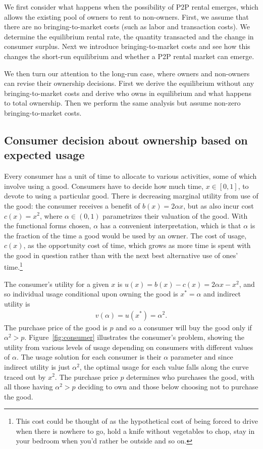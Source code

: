 \documentclass[11pt]{article}
\begin{document}
We first consider what happens when the possibility of P2P rental emerges, which allows the existing pool of owners to rent to non-owners. 
First, we assume that there are no bringing-to-market costs (such as labor and transaction costs).
We determine the equilibrium rental rate, the quantity transacted and the change in consumer surplus. 
Next we introduce bringing-to-market costs and see how this changes the short-run equilibrium and whether a P2P rental market can emerge. 

We then turn our attention to the long-run case, where owners and non-owners can revise their ownership decisions.
First we derive the equilibrium without any bringing-to-market costs and derive who owns in equilibrium and what happens to total ownership.
Then we perform the same analysis but assume non-zero bringing-to-market costs. 

\subsection{Consumer decision about ownership based on expected usage}  
Every consumer has a unit of time to allocate to various activities, some of which involve using a good.  
Consumers have to decide how much time, $x \in [0,1]$, to devote to using a particular good. 
There is decreasing marginal utility from use of the good: 
the consumer receives a benefit of $b(x) = 2\alpha x$, but as also incur cost $c(x) = x^2$,  
where $\alpha \in (0,1)$ parametrizes their valuation of the good.
With the functional forms chosen, $\alpha$ has a convenient interpretation, which is that $\alpha$ is the fraction of the time a good would be used by an owner. 
The cost of usage, $c(x)$, as the opportunity cost of time, which grows as more time is spent with the good in question rather than with the next best alternative use of ones' time.\footnote{
  This cost could be thought of as the hypothetical cost of being forced to drive when there is nowhere to go, hold a knife without vegetables to chop, stay in your bedroom when you'd rather be outside and so on. 
}

The consumer's utility for a given $x$ is $u(x) = b(x) - c(x) = 2 \alpha x - x^2$, and so individual usage conditional upon owning the good is $x^* = \alpha$ and indirect utility is 
\begin{align}
v(\alpha) = u(x^*) = \alpha^2.  
\end{align} 
The purchase price of the good is $p$ and so a consumer will buy the good only if $\alpha^2 > p$. 
Figure~\ref{fig:consumer} illustrates the consumer's problem, showing the utility from various levels of usage depending on consumers with different values of $\alpha$.
The usage solution for each consumer is their $\alpha$ parameter and since indirect utility is just $\alpha^2$, the optimal usage for each value falls along the curve traced out by $x^2$.
The purchase price $p$ determines who purchases the good, with all those having $\alpha^2 > p$ deciding to own and those below choosing not to purchase the good. 
\end{document}
